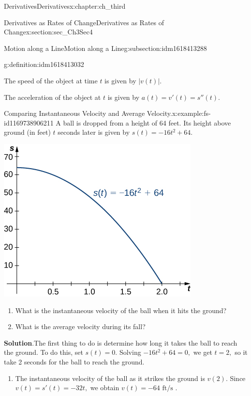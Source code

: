 \documentclass[oneside,10pt,]{book}
\newcommand{\blocktitlefont}{\relax}
\numberwithin{equation}{section}
\begin{document}
\begin{chapterptx}{Derivatives}{}{Derivatives}{}{}{x:chapter:ch_third}
\begin{sectionptx}{Derivatives as Rates of Change}{}{Derivatives as Rates of Change}{}{}{x:section:sec_Ch3Sec4}
\begin{subsectionptx}{Motion along a Line}{}{Motion along a Line}{}{}{g:subsection:idm1618413288}
\begin{definition}{}{g:definition:idm1618413032}
\par
The speed of the object at time \(t\) is given by \(|v(t)|.\)%
\par
The acceleration of the object at \(t\) is given by \(a(t)=v'(t)=s''(t).\)%
\end{definition}
\begin{example}{Comparing Instantaneous Velocity and Average Velocity.}{x:example:fs-id1169738906211}%
A ball is dropped from a height of 64 feet. Its height above ground (in feet) \(t\) seconds later is given by \(s(t)=-16t^2+64.\)%
\begin{image}{0.25}{0.5}{0.25}%
\includegraphics[width=\linewidth]{external/CNX_Calc_Figure_03_04_002.jpg}
\end{image}%
%
\begin{enumerate}[label=(\alph*)]
\item{}What is the instantaneous velocity of the ball when it hits the ground?%
\item{}What is the average velocity during its fall?%
\end{enumerate}
\par\smallskip%
\noindent\textbf{\blocktitlefont Solution}.\hypertarget{g:solution:idm1618404840}{}\quad{}The first thing to do is determine how long it takes the ball to reach the ground. To do this, set \(s(t)=0.\) Solving \(-16t^2+64=0,\) we get \(t=2,\) so it take 2 seconds for the ball to reach the ground.%
%
\begin{enumerate}[label=(\alph*)]
\item{}The instantaneous velocity of the ball as it strikes the ground is \(v(2).\) Since \(v(t)=s'(t)=-32t,\) we obtain \(v(t)=-64 \text{ ft/s }.\)%

\end{enumerate}
\end{example}
\end{subsectionptx}
\end{sectionptx}
\end{chapterptx}
\end{document}

